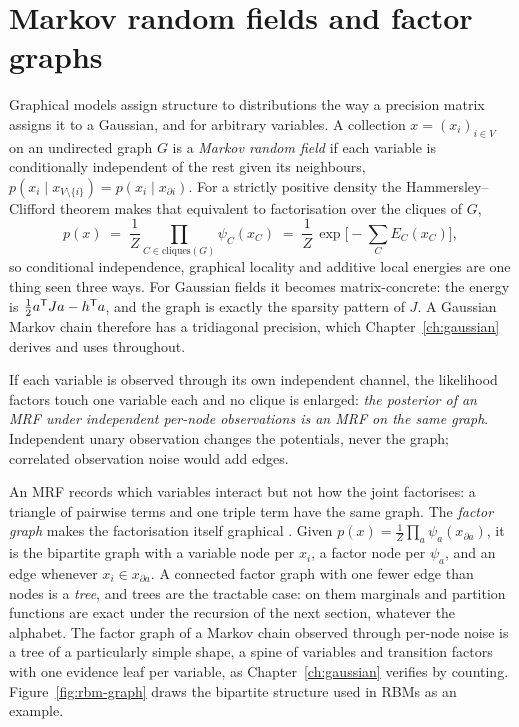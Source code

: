 \section{Markov random fields and factor graphs}\label{sec:mrf}
\label{sec:factor-graphs}

Graphical models assign structure to distributions the way a precision matrix
assigns it to a Gaussian, and for arbitrary variables. A collection
$x = (x_i)_{i \in V}$ on an undirected graph $G$ is a \emph{Markov random field}
if each variable is conditionally independent of the rest given its neighbours,
$p(x_i \mid x_{V \setminus \{i\}}) = p(x_i \mid x_{\partial i})$. For a
strictly positive density the Hammersley--Clifford theorem
\citep{besag1974spatial} makes that equivalent to factorisation over the cliques
of $G$,
\begin{equation}
  p(x) \;=\; \frac{1}{Z} \prod_{C \in \mathrm{cliques}(G)} \psi_C(x_C)
  \;=\; \frac{1}{Z}\, \exp\Big[ -\sum_C E_C(x_C) \Big] ,
  \label{eq:hammersley-clifford}
\end{equation}
so conditional independence, graphical locality and additive local energies are
one thing seen three ways. For Gaussian fields it becomes matrix-concrete: the
energy is $\tfrac12 a^{\mathsf{T}} J a - h^{\mathsf{T}} a$, and the graph is exactly the sparsity
pattern of $J$. A Gaussian Markov chain therefore has a tridiagonal precision,
which Chapter~\ref{ch:gaussian} derives and uses throughout.

If each variable is observed through
its own independent channel, the likelihood factors touch one variable each and
no clique is enlarged: \emph{the posterior of an MRF under independent per-node
observations is an MRF on the same graph}. Independent unary observation
changes the potentials, never the graph; correlated observation noise would add
edges.

An MRF records which variables interact but not how the joint factorises: a
triangle of pairwise terms and one triple term have the same graph. The
\emph{factor graph} makes the factorisation itself graphical
\citep{kschischang2001factor}. Given
$p(x) = \frac{1}{Z}\prod_a \psi_a(x_{\partial a})$, it is the bipartite graph
with a variable node per $x_i$, a factor node per $\psi_a$, and an edge whenever
$x_i \in x_{\partial a}$. A connected factor graph with one fewer edge than
nodes is a \emph{tree}, and trees are the tractable case: on them marginals and
partition functions are exact under the recursion of the next section, whatever
the alphabet. The factor graph of a Markov chain observed through per-node
noise is a tree of a particularly simple shape, a spine of variables and
transition factors with one evidence leaf per variable, as
Chapter~\ref{ch:gaussian} verifies by counting.
Figure~\ref{fig:rbm-graph}
draws the bipartite structure used in RBMs as an example.

